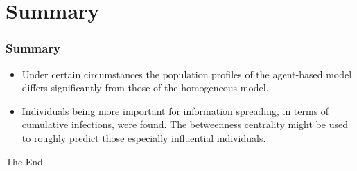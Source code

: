 \documentclass{beamer}
\begin{document}
\section{Summary} %

\begin{frame}
\frametitle{Summary}

\begin{itemize}

\item Under certain circumstances the population profiles of the agent-based model differs significantly from those of the homogeneous model.

\vspace{1cm}
\item Individuals being more important for information spreading, in terms of cumulative infections, were found. The betweenness centrality might be used to roughly predict those especially influential individuals.


\end{itemize}

\end{frame}



\begin{frame}
\Huge{\centerline{The End}}
\end{frame}

\end{document}
